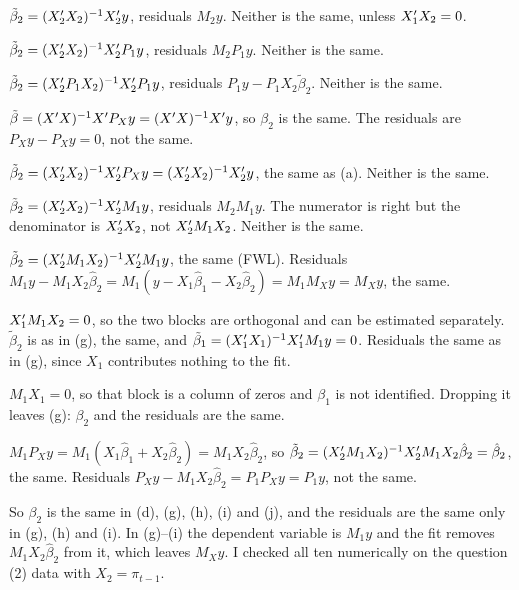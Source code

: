 \documentclass[11pt]{article}
\begin{document}
\begin{flatlist}
  \item[(a)] $\tilde\beta_{2} = (X_{2}^{\prime} X_{2})^{-1}X_{2}^{\prime} y$, residuals $M_{2}y$. Neither is the same, unless $X_{1}^{\prime} X_{2} = 0$.
  \item[(b)] $\tilde\beta_{2} = (X_{2}^{\prime} X_{2})^{-1}X_{2}^{\prime} P_{1}y$, residuals $M_{2}P_{1}y$. Neither is the same.
  \item[(c)] $\tilde\beta_{2} = (X_{2}^{\prime} P_{1}X_{2})^{-1}X_{2}^{\prime} P_{1}y$, residuals $P_{1}y - P_{1}X_{2}\tilde\beta_{2}$. Neither is the same.
  \item[(d)] $\tilde\beta = (X^{\prime} X)^{-1}X^{\prime} P_{X}y = (X^{\prime} X)^{-1}X^{\prime} y$, so $\beta_{2}$ is the same.
             The residuals are $P_{X}y - P_{X}y = 0$, not the same.
  \item[(e)] $\tilde\beta_{2} = (X_{2}^{\prime} X_{2})^{-1}X_{2}^{\prime} P_{X}y = (X_{2}^{\prime} X_{2})^{-1}X_{2}^{\prime} y$, the same as (a). Neither is the same.
  \item[(f)] $\tilde\beta_{2} = (X_{2}^{\prime} X_{2})^{-1}X_{2}^{\prime} M_{1}y$, residuals $M_{2}M_{1}y$.
             The numerator is right but the denominator is $X_{2}^{\prime} X_{2}$, not $X_{2}^{\prime} M_{1}X_{2}$. Neither is the same.
  \item[(g)] $\tilde\beta_{2} = (X_{2}^{\prime} M_{1}X_{2})^{-1}X_{2}^{\prime} M_{1}y$, the same (FWL).
             Residuals $M_{1}y - M_{1}X_{2}\hat\beta_{2} = M_{1}(y - X_{1}\hat\beta_{1} - X_{2}\hat\beta_{2}) = M_{1}M_{X}y = M_{X}y$, the same.
  \item[(h)] $X_{1}^{\prime} M_{1}X_{2} = 0$, so the two blocks are orthogonal and can be estimated separately.
             $\tilde\beta_{2}$ is as in (g), the same, and $\tilde\beta_{1} = (X_{1}^{\prime} X_{1})^{-1}X_{1}^{\prime} M_{1}y = 0$.
             Residuals the same as in (g), since $X_{1}$ contributes nothing to the fit.
  \item[(i)] $M_{1}X_{1} = 0$, so that block is a column of zeros and $\beta_{1}$ is not identified.
             Dropping it leaves (g): $\beta_{2}$ and the residuals are the same.
  \item[(j)] $M_{1}P_{X}y = M_{1}(X_{1}\hat\beta_{1} + X_{2}\hat\beta_{2}) = M_{1}X_{2}\hat\beta_{2}$, so
             $\tilde\beta_{2} = (X_{2}^{\prime} M_{1}X_{2})^{-1}X_{2}^{\prime} M_{1}X_{2}\hat\beta_{2} = \hat\beta_{2}$, the same.
             Residuals $P_{X}y - M_{1}X_{2}\hat\beta_{2} = P_{1}P_{X}y = P_{1}y$, not the same.
\end{flatlist}

So $\beta_{2}$ is the same in (d), (g), (h), (i) and (j), and the residuals are the same only in (g), (h) and (i).
In (g)--(i) the dependent variable is $M_{1}y$ and the fit removes $M_{1}X_{2}\hat\beta_{2}$ from it, which leaves $M_{X}y$.
I checked all ten numerically on the question (2) data with $X_{2} = \pi_{t-1}$.
\end{document}
